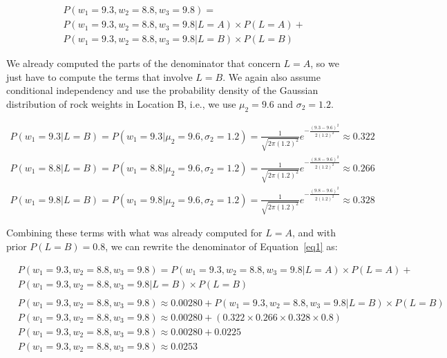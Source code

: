 \documentclass[leqno]{article}
\begin{document}
\begin{equation*}
\begin{split}
&P(w_1 = 9.3, w_2 = 8.8, w_3 = 9.8) = 
\\
&P(w_1 = 9.3, w_2 = 8.8, w_3 = 9.8| L = A) \times P(L = A) + 
\\
&P(w_1 = 9.3, w_2 = 8.8, w_3 = 9.8| L = B) \times P(L = B) 
\end{split}
\end{equation*}

\noindent We already computed the parts of the denominator that concern $L = A$, so we just have to compute the terms that involve $L = B$. We
again also assume conditional independency and use the probability density of the 
Gaussian distribution of rock weights in Location B, i.e., we use $\mu_2 = 9.6$ and $\sigma_2 = 1.2$.

\begin{equation*}
\begin{split}
P(w_1 = 9.3 | L = B) = P(w_1 = 9.3 | \mu_2 = 9.6, \sigma_2 = 1.2) = \frac{1}{\sqrt{2\pi(1.2)^2}}e^{-\frac{(9.3 - 9.6)^2}{2(1.2)^2}} \approx 0.322 
\\
P(w_1 = 8.8 | L = B) = P(w_1 = 8.8 | \mu_2 = 9.6, \sigma_2 = 1.2) = \frac{1}{\sqrt{2\pi(1.2)^2}}e^{-\frac{(8.8 - 9.6)^2}{2(1.2)^2}} \approx 0.266
\\
P(w_1 = 9.8 | L = B) = P(w_1 = 9.8 | \mu_2 = 9.6, \sigma_2 = 1.2) = \frac{1}{\sqrt{2\pi(1.2)^2}}e^{-\frac{(9.8 - 9.6)^2}{2(1.2)^2}} \approx 0.328
\end{split}
\end{equation*}

\noindent Combining these terms with what was already computed for $L = A$, and with prior $P(L = B) = 0.8$, we can rewrite the denominator of Equation~\ref{eq1} as:

\begin{equation*}
\begin{split}
&P(w_1 = 9.3, w_2 = 8.8, w_3 = 9.8) = P(w_1 = 9.3, w_2 = 8.8, w_3 = 9.8| L = A) \times P(L = A) + 
\\
&P(w_1 = 9.3, w_2 = 8.8, w_3 = 9.8| L = B) \times P(L = B)
\\
\\
&P(w_1 = 9.3, w_2 = 8.8, w_3 = 9.8) \approx 0.00280 + P(w_1 = 9.3, w_2 = 8.8, w_3 = 9.8| L = B) \times P(L = B)
\\
&P(w_1 = 9.3, w_2 = 8.8, w_3 = 9.8) \approx 0.00280 +  (0.322 \times 0.266 \times 0.328 \times 0.8)
\\
&P(w_1 = 9.3, w_2 = 8.8, w_3 = 9.8) \approx 0.00280 + 0.0225 
\\
&P(w_1 = 9.3, w_2 = 8.8, w_3 = 9.8) \approx 0.0253
\end{split}
\end{equation*}
\end{document}
